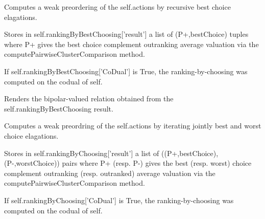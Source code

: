 \documentclass[letterpaper,10pt,english]{sphinxmanual}
\begin{document}
\begin{fulllineitems}
\begin{fulllineitems}
\end{fulllineitems}


\begin{fulllineitems}
\label{techDoc:digraphs.Digraph.computeRankingByBestChoosing}
Computes a weak preordering of the self.actions by recursive
best choice elagations.

Stores in self.rankingByBestChoosing{[}'result'{]} a list of (P+,bestChoice) tuples
where P+ gives the best choice complement outranking
average valuation via the computePairwiseClusterComparison
method.

If self.rankingByBestChoosing{[}'CoDual'{]} is True, 
the ranking-by-choosing was computed on the codual of self.

\end{fulllineitems}


\begin{fulllineitems}
\label{techDoc:digraphs.Digraph.computeRankingByBestChoosingRelation}
Renders the bipolar-valued relation obtained from
the self.rankingByBestChoosing result.

\end{fulllineitems}


\begin{fulllineitems}
\label{techDoc:digraphs.Digraph.computeRankingByChoosing}
Computes a weak preordring of the self.actions by iterating
jointly best and worst choice elagations.

Stores in self.rankingByChoosing{[}'result'{]} a list of ((P+,bestChoice),(P-,worstChoice)) pairs
where P+ (resp. P-) gives the best (resp. worst) choice complement outranking
(resp. outranked) average valuation via the computePairwiseClusterComparison
method.

If self.rankingByChoosing{[}'CoDual'{]} is True, the ranking-by-choosing was computed on the codual of self.


\end{fulllineitems}
\end{fulllineitems}
\end{document}
